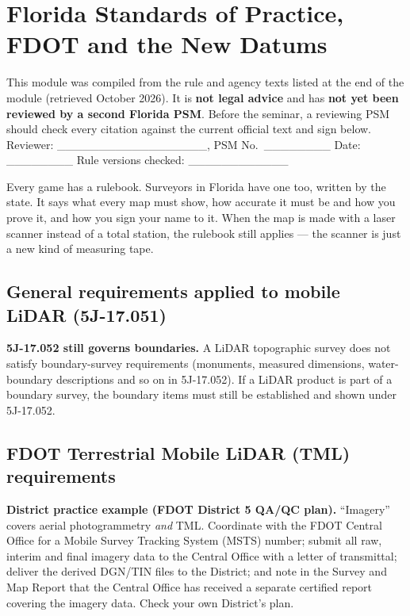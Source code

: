 \chapter{Florida Standards of Practice, FDOT and the New Datums}

\begin{warning}[title={REGULATORY REVIEW REQUIRED BEFORE TEACHING}]
This module was compiled from the rule and agency texts listed at the end of the module (retrieved October 2026). It is \textbf{not legal advice} and has \textbf{not yet been reviewed by a second Florida PSM}. Before the seminar, a reviewing PSM should check every citation against the current official text and sign below.\\[4pt]
Reviewer: \_\_\_\_\_\_\_\_\_\_\_\_\_\_\_\_\_\_, PSM No.\ \_\_\_\_\_\_\_\_ \quad Date: \_\_\_\_\_\_\_\_ \quad Rule versions checked: \_\_\_\_\_\_\_\_\_\_\_\_
\end{warning}

\begin{kid}
Every game has a rulebook. Surveyors in Florida have one too, written by the state. It says what every map must show, how accurate it must be and how you prove it, and how you sign your name to it. When the map is made with a laser scanner instead of a total station, the rulebook still applies --- the scanner is just a new kind of measuring tape.
\end{kid}

\section{General requirements applied to mobile LiDAR (5J-17.051)}

\begin{tip}
\textbf{5J-17.052 still governs boundaries.} A LiDAR topographic survey does not satisfy boundary-survey requirements (monuments, measured dimensions, water-boundary descriptions and so on in 5J-17.052). If a LiDAR product is part of a boundary survey, the boundary items must still be established and shown under 5J-17.052.
\end{tip}

\section{FDOT Terrestrial Mobile LiDAR (TML) requirements}

\begin{tip}
\textbf{District practice example (FDOT District 5 QA/QC plan).} ``Imagery'' covers aerial photogrammetry \emph{and} TML. Coordinate with the FDOT Central Office for a Mobile Survey Tracking System (MSTS) number; submit all raw, interim and final imagery data to the Central Office with a letter of transmittal; deliver the derived DGN/TIN files to the District; and note in the Survey and Map Report that the Central Office has received a separate certified report covering the imagery data. Check your own District's plan.
\end{tip}

